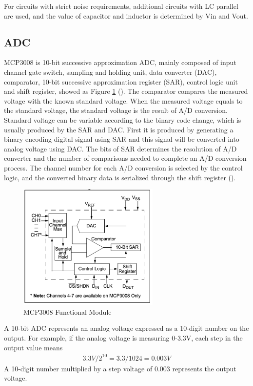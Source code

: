 For circuits with strict noise requirements, additional circuits with LC parallel are used, and the value of capacitor and inductor is determined by Vin and Vout.
\subsection{ADC}
MCP3008 is 10-bit successive approximation ADC, mainly composed of input channel gate switch, sampling and holding unit, data converter (DAC), comparator, 10-bit successive approximation register (SAR), control logic unit and shift register, showed as Figure \ref{fig:ADC} (\cite{mcp3008}). The comparator compares the measured voltage with the known standard voltage. When the measured voltage equals to the standard voltage, the standard voltage is the result of A/D conversion. Standard voltage can be variable according to the binary code change, which is usually produced by the SAR and DAC. First it is produced by generating a binary encoding digital signal using SAR and this signal will be converted into analog voltage using DAC. The bits of SAR determines the resolution of A/D converter and the number of comparisons needed to complete an A/D conversion process. The channel number for each A/D conversion is selected by the control logic, and the converted binary data is serialized through the shift register (\cite{ADConverter}).
\begin{figure}[H]
    \centering
    \includegraphics[width=7cm]{figure/ADC.png}
    \caption{MCP3008 Functional Module}
    \label{fig:ADC}
\end{figure}
A 10-bit ADC represents an analog voltage expressed as a 10-digit number on the output. For example, if the analog voltage is measuring 0-3.3V, each step in the output value means 
\begin{align}
 3.3V /2^{10} = 3.3/1024 = 0.003V   
\end{align}
A 10-digit number multiplied by a step voltage of 0.003 represents the output voltage.
